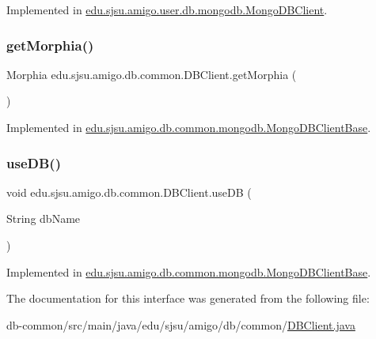 Implemented in \hyperlink{classedu_1_1sjsu_1_1amigo_1_1user_1_1db_1_1mongodb_1_1_mongo_d_b_client_aed337080b1cdb29cdc02b10ba51bddc5}{edu.\+sjsu.\+amigo.\+user.\+db.\+mongodb.\+Mongo\+D\+B\+Client}.

\mbox{\label{interfaceedu_1_1sjsu_1_1amigo_1_1db_1_1common_1_1_d_b_client_a501198821f5a98b90ae7f13c3743e655}} 
\subsubsection{\texorpdfstring{get\+Morphia()}{getMorphia()}}
{\footnotesize\ttfamily Morphia edu.\+sjsu.\+amigo.\+db.\+common.\+D\+B\+Client.\+get\+Morphia (\begin{DoxyParamCaption}{ }\end{DoxyParamCaption})}



Implemented in \hyperlink{classedu_1_1sjsu_1_1amigo_1_1db_1_1common_1_1mongodb_1_1_mongo_d_b_client_base_ab0c99c600064e004c29f459b7dc86650}{edu.\+sjsu.\+amigo.\+db.\+common.\+mongodb.\+Mongo\+D\+B\+Client\+Base}.

\mbox{\label{interfaceedu_1_1sjsu_1_1amigo_1_1db_1_1common_1_1_d_b_client_a0bc8dff41980a640f09af840f9a361e5}} 
\subsubsection{\texorpdfstring{use\+D\+B()}{useDB()}}
{\footnotesize\ttfamily void edu.\+sjsu.\+amigo.\+db.\+common.\+D\+B\+Client.\+use\+DB (\begin{DoxyParamCaption}\item[{String}]{db\+Name }\end{DoxyParamCaption})}



Implemented in \hyperlink{classedu_1_1sjsu_1_1amigo_1_1db_1_1common_1_1mongodb_1_1_mongo_d_b_client_base_ae5ba446aa4f03a5846f3c9e59ff10cca}{edu.\+sjsu.\+amigo.\+db.\+common.\+mongodb.\+Mongo\+D\+B\+Client\+Base}.



The documentation for this interface was generated from the following file\+:\begin{DoxyCompactItemize}
\item 
db-\/common/src/main/java/edu/sjsu/amigo/db/common/\hyperlink{_d_b_client_8java}{D\+B\+Client.\+java}\end{DoxyCompactItemize}
